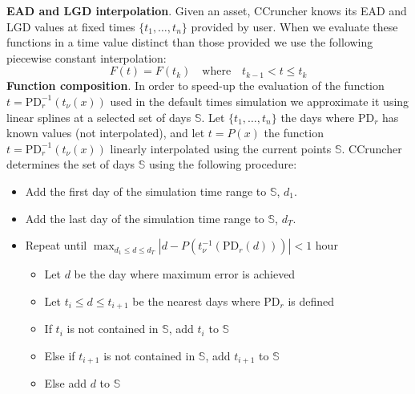 \documentclass[11pt,fleqn]{book} %
\begin{document}
\textbf{EAD and LGD interpolation}. Given an asset, CCruncher knows its EAD 
and LGD values at fixed times $\{t_1,\dots,t_n\}$ provided by user. When 
we evaluate these functions in a time value distinct than those provided we 
use the following piecewise constant interpolation:
\begin{displaymath}
	F(t) = F(t_k) \quad \text{where} \quad t_{k-1} < t \le t_{k}
\end{displaymath}
\textbf{Function composition}. In order to speed-up the evaluation of the
function $t=\text{PD}_r^{-1}(t_{\nu}(x))$ used in the default times simulation
we approximate it using linear splines at a selected set of days $\mathbb{S}$. 
Let $\{t_1,\dots,t_n\}$ the days where $\text{PD}_r$ has known values (not 
interpolated), and let $t=P(x)$ the function $t=\text{PD}_r^{-1}(t_{\nu}(x))$ 
linearly interpolated using the current points $\mathbb{S}$. 
CCruncher determines the set of days $\mathbb{S}$ using the following 
procedure:
\begin{itemize}
	\item Add the first day of the simulation time range to $\mathbb{S}$, $d_1$.
	\item Add the last day of the simulation time range to $\mathbb{S}$, $d_T$.
	\item Repeat until $\displaystyle \max_{d_1 \le d \le d_T}\left|d - P(t_{\nu}^{-1}(\text{PD}_r(d)))\right| < 1$ hour
	\begin{itemize}
		\item Let $d$ be the day where maximum error is achieved
		\item Let $t_i \le d \le t_{i+1}$ be the nearest days where $\text{PD}_r$ is defined
		\item If $t_i$ is not contained in $\mathbb{S}$, add $t_i$ to $\mathbb{S}$
		\item Else if $t_{i+1}$ is not contained in $\mathbb{S}$, add $t_{i+1}$ to $\mathbb{S}$
		\item Else add $d$ to $\mathbb{S}$
	\end{itemize}
\end{itemize}
\end{document}
